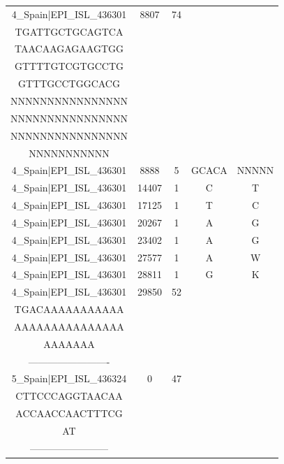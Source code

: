 \documentclass[a4paper,10pt]{article}
\begin{document}
\begin{longtable}{@{}ccccc@{}}
4\_Spain|EPI\_ISL\_436301 & 8807 & 74 & \begin{tabular}[c]{@{}c@{}}ACAAAGCTTGCCCAT\\ TGATTGCTGCAGTCA\\ TAACAAGAGAAGTGG\\ GTTTTGTCGTGCCTG\\ GTTTGCCTGGCACG\end{tabular} & \begin{tabular}[c]{@{}c@{}}NNNNNNNNNNNNNNN\\ NNNNNNNNNNNNNNNN\\ NNNNNNNNNNNNNNNN\\ NNNNNNNNNNNNNNNN\\ NNNNNNNNNNN\end{tabular} \\* \midrule
4\_Spain|EPI\_ISL\_436301 & 8888 & 5 & GCACA & NNNNN \\* \midrule
4\_Spain|EPI\_ISL\_436301 & 14407 & 1 & C & T \\* \midrule
4\_Spain|EPI\_ISL\_436301 & 17125 & 1 & T & C \\* \midrule
4\_Spain|EPI\_ISL\_436301 & 20267 & 1 & A & G \\* \midrule
4\_Spain|EPI\_ISL\_436301 & 23402 & 1 & A & G \\* \midrule
4\_Spain|EPI\_ISL\_436301 & 27577 & 1 & A & W \\* \midrule
4\_Spain|EPI\_ISL\_436301 & 28811 & 1 & G & K \\* \midrule
4\_Spain|EPI\_ISL\_436301 & 29850 & 52 & \begin{tabular}[c]{@{}c@{}}AGCTTCTTAGGAGAA\\ TGACAAAAAAAAAAA\\ AAAAAAAAAAAAAAA\\ AAAAAAA\end{tabular} & \begin{tabular}[c]{@{}c@{}}---------------------------\\ -------------------------\end{tabular} \\* \midrule
5\_Spain|EPI\_ISL\_436324 & 0 & 47 & \begin{tabular}[c]{@{}c@{}}ATTAAAGGTTTATAC\\ CTTCCCAGGTAACAA\\ ACCAACCAACTTTCG\\ AT\end{tabular} & \begin{tabular}[c]{@{}c@{}}-----------------------\\ ------------------------\end{tabular} \\* \midrule

\end{longtable}
\end{document}
